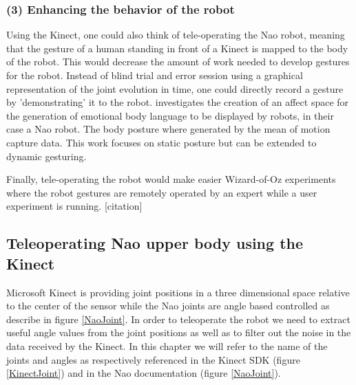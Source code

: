 \documentclass[a4paper,11pt]{article}
\newcommand{\todo}[1]{{\small\color{red}[#1]}}
\begin{document}
\subsubsection*{(3) Enhancing the behavior of the robot}

Using the Kinect, one could also think of tele-operating the Nao robot, meaning that the gesture of a human standing in front of a Kinect is mapped to the body of the robot. This would decrease the amount of work needed to develop gestures for the robot. Instead of blind trial and error session using a graphical representation of the joint evolution in time, one could directly record a gesture by 'demonstrating' it to the robot. \cite{beck2010towards} investigates the creation of an affect space for the generation of emotional body language to be displayed by robots, in their case a Nao robot. The body posture where generated by the mean of motion capture data. This work focuses on static posture but can be extended to dynamic gesturing.

Finally, tele-operating the robot would make easier Wizard-of-Oz experiments where the robot gestures are remotely operated by an expert while a user experiment is running. \todo{citation}

\subsection{Teleoperating Nao upper body using the Kinect}

Microsoft Kinect is providing joint positions in a three dimensional space relative to the center of the sensor while the Nao joints are angle based controlled as describe in figure \ref{NaoJoint}. In order to teleoperate the robot we need to extract useful angle values from the joint positions as well as to filter out the noise in the data received by the Kinect. In this chapter we will refer to the name of the joints and angles as respectively referenced in the Kinect SDK (figure \ref{KinectJoint}) and in the Nao documentation (figure \ref{NaoJoint}).
\end{document}
